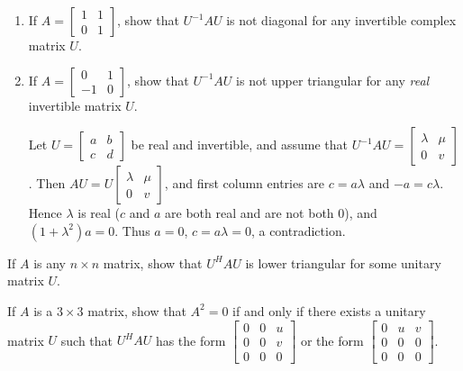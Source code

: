 \documentclass{ximera}
\begin{document}
\begin{problem}\label{prb:complex_matrices21}
\begin{enumerate}
\item If $A = \left[ \begin{array}{rr}
1 & 1 \\
0 & 1
\end{array}\right]$, show that $U^{-1}AU$ is not diagonal for any invertible complex matrix $U$.

\item If $A = \left[ \begin{array}{rr}
0 & 1 \\
-1 & 0
\end{array}\right]$, show that $U^{-1}AU$ is not upper triangular for any \textit{real} invertible matrix $U$.
\begin{hint}
Let $U = \left[ \begin{array}{rr}
a & b \\
c & d
\end{array}\right]$ be real and invertible, and assume that $U^{-1}AU = \left[ \begin{array}{rr}
\lambda & \mu \\
0 & v
\end{array}\right]$.
 Then $AU = U\left[ \begin{array}{rr}
 \lambda & \mu \\
 0 & v
 \end{array}\right]$, and first column entries are $c = a\lambda$ and $-a = c\lambda$. Hence $\lambda$ is real ($c$ and $a$ are both real and are not both $0$), and $(1 + \lambda^{2})a = 0$. Thus $a = 0$, $c = a\lambda = 0$, a contradiction.
\end{hint}
\end{enumerate}
\end{problem}

\begin{problem}\label{prb:complex_matrices22}
If $A$ is any $n \times n$ matrix, show that $U^{H}AU$ is lower triangular for some unitary matrix $U$.
\end{problem}

\begin{problem}\label{prb:complex_matrices23}
If $A$ is a $3 \times 3$ matrix, show that $A^{2} = 0$ if and only if there exists a unitary matrix $U$ such that $U^{H}AU$ has the form $\left[ \begin{array}{rrr}
0 & 0 & u \\
0 & 0 & v \\
0 & 0 & 0
\end{array}\right]$
or the form $\left[ \begin{array}{rrr}
0 & u & v \\
0 & 0 & 0 \\
0 & 0 & 0
\end{array}\right]$.
\end{problem}
\end{document}
